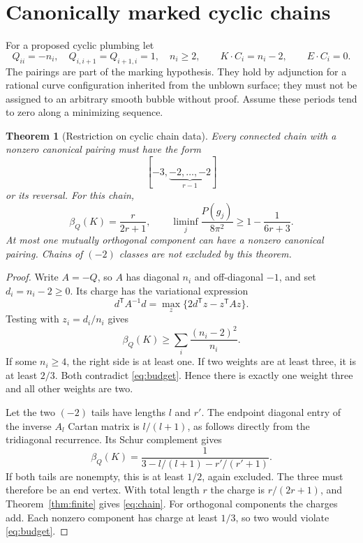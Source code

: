 \documentclass[11pt,a4paper]{article}
\newtheorem{theorem}{Theorem}[section]
\theoremstyle{definition}
\theoremstyle{remark}
\begin{document}
\section{Canonically marked cyclic chains}
For a proposed cyclic plumbing let
\[
 Q_{ii}=-n_i,\quad Q_{i,i+1}=Q_{i+1,i}=1,\quad n_i\ge2,
 \qquad K\cdot C_i=n_i-2,
 \qquad E\cdot C_i=0.
\]
The pairings are part of the marking hypothesis. They hold by adjunction
for a rational curve configuration inherited from the unblown surface;
they must not be assigned to an arbitrary smooth bubble without proof.
Assume these periods tend to zero along a minimizing sequence.

\begin{theorem}[Restriction on cyclic chain data]\label{thm:chain}
Every connected chain with a nonzero canonical pairing must have the form
\[
 [-3,\underbrace{-2,\ldots,-2}_{r-1}]
\]
or its reversal. For this chain,
\begin{equation}\label{eq:chain}
 \beta_Q(K)=\frac{r}{2r+1},\qquad
 \liminf_j\frac{P(g_j)}{8\pi^2}\ge1-\frac1{6r+3}.
\end{equation}
At most one mutually orthogonal component can have a nonzero canonical
pairing. Chains of $(-2)$ classes are not excluded by this theorem.
\end{theorem}
\begin{proof}
Write $A=-Q$, so $A$ has diagonal $n_i$ and off-diagonal $-1$, and set
$d_i=n_i-2\ge0$. Its charge has the variational expression
\[
 d^{\mathsf T}A^{-1}d
 =\max_z\{2d^{\mathsf T}z-z^{\mathsf T}Az\}.
\]
Testing with $z_i=d_i/n_i$ gives
\[
 \beta_Q(K)\ge\sum_i\frac{(n_i-2)^2}{n_i}.
\]
If some $n_i\ge4$, the right side is at least one. If two weights are
at least three, it is at least $2/3$. Both contradict
\eqref{eq:budget}. Hence there is exactly one weight three and all other
weights are two.

Let the two $(-2)$ tails have lengths $l$ and $r'$. The endpoint diagonal
entry of the inverse $A_l$ Cartan matrix is $l/(l+1)$, as follows directly
from the tridiagonal recurrence. Its Schur complement gives
\[
 \beta_Q(K)=
 \frac1{3-l/(l+1)-r'/(r'+1)}.
\]
If both tails are nonempty, this is at least $1/2$, again excluded. The
three must therefore be an end vertex. With total length $r$ the charge
is $r/(2r+1)$, and Theorem~\ref{thm:finite} gives \eqref{eq:chain}.
For orthogonal components the charges add. Each nonzero component has
charge at least $1/3$, so two would violate \eqref{eq:budget}.
\end{proof}
\end{document}
